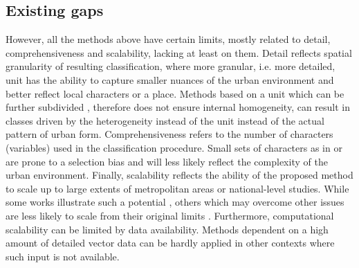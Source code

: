 \subsection{Existing gaps}
\label{sec:lit_gaps}
However, all the methods above have certain limits, mostly related to detail, comprehensiveness and scalability, lacking at least on them. Detail reflects spatial granularity of resulting classification, where more granular, i.e. more detailed, unit has the ability to capture smaller nuances of the urban environment and better reflect local characters or a place. Methods based on a unit which can be further subdivided \citep{dibble2019origin,jochem2020,araldi2019,gil2012}, therefore does not ensure internal homogeneity, can result in classes driven by the heterogeneity instead of the unit instead of the actual pattern of urban form. Comprehensiveness refers to the number of characters (variables) used in the classification procedure. Small sets of characters as in \cite{bobkova2019} or \cite{serra2018a} are prone to a selection bias and will less likely reflect the complexity of the urban environment. Finally, scalability reflects the ability of the proposed method to scale up to large extents of metropolitan areas or national-level studies. While some works illustrate such a potential \citep{jochem2020, schirmer2015,bobkova2019,araldi2019}, others which may overcome other issues are less likely to scale from their original limits \citep{dibble2019origin}. Furthermore, computational scalability can be limited by data availability. Methods dependent on a high amount of detailed vector data \citep{bobkova2019} can be hardly applied in other contexts where such input is not available.

